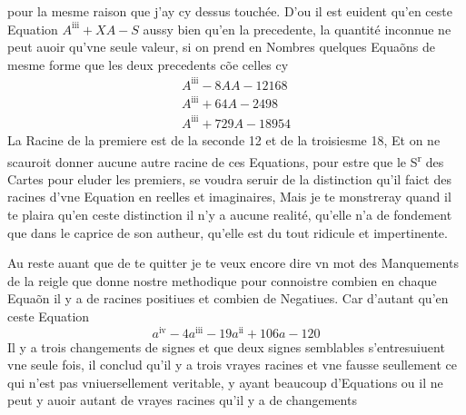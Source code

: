\documentclass[11pt,a4paper]{article}
\begin{document}

pour la mesme raison que j'ay cy dessus touchée. D'ou il est euident qu'en ceste Equation $A^{\mathrm{iii}} + XA - S$ aussy bien qu'en la precedente, la quantité inconnue ne peut auoir qu'vne seule valeur, si on prend en Nombres quelques Equaõns de mesme forme que les deux precedents cõe celles cy
\[ \begin{array}{l} A^{\mathrm{iii}} - 8AA - 12168 \\ A^{\mathrm{iii}} + 64A - 2498 \\ A^{\mathrm{iii}} + 729A - 18954 \end{array} \]
La Racine de la premiere est  de la seconde 12 et de la troisiesme 18, \struck{\ill{}} Et on ne scauroit donner aucune autre racine de ces Equations, pour estre que le S\textsuperscript{r} des Cartes pour eluder les premiers, se voudra seruir de la distinction qu'il faict des racines d'vne Equation  en reelles et imaginaires, Mais je te monstreray quand il te plaira qu'en ceste distinction il n'y a aucune realité, qu'elle n'a de fondement que dans le caprice de son autheur, qu'elle est du tout ridicule et impertinente.

Au reste auant que de te quitter je te veux encore dire vn mot des Manquements de la reigle que donne nostre methodique pour connoistre combien en chaque Equaõn il y a de racines positiues et combien de Negatiues. Car d'autant qu'en ceste Equation
\[ a^{\mathrm{iv}} - 4a^{\mathrm{iii}} - 19a^{\mathrm{ii}} + 106a - 120 \]
Il y a trois changements de signes et que deux signes semblables s'entresuiuent vne seule fois, il conclud qu'il y a trois vrayes racines et vne fausse seullement ce qui n'est pas vniuersellement veritable, y ayant beaucoup d'Equations ou il ne peut y auoir autant de vrayes racines qu'il y a de changements
\end{document}
